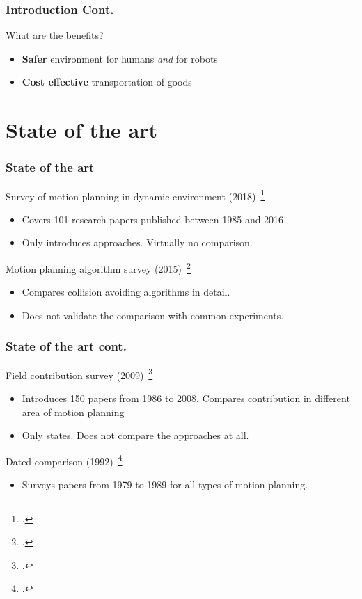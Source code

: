 \documentclass{beamer}
\begin{document}
\begin{frame}
    \frametitle{\huge{Introduction Cont.}}
    \begin{block}{What are the benefits?}
        \begin{itemize}
            \item \textbf{Safer} environment for humans \textit{and} for robots
            \item \textbf{Cost effective} transportation of goods
        \end{itemize} 
    \end{block}
\end{frame}

\section{State of the art}
\begin{frame}
    \frametitle{\huge{State of the art}}
    \begin{block}{Survey of motion planning in dynamic environment (2018)~\footcite{mohanan2018a}}
        \begin{itemize}
            \color{blue} \item Covers 101 research papers published between 1985 and 2016
            \color{red}  \item Only introduces approaches. Virtually no comparison.
        \end{itemize}
    \end{block}
    \begin{block}{Motion planning algorithm survey (2015)~\footcite{hoy2015algorithms}}
        \begin{itemize}
            \color{blue} \item Compares collision avoiding algorithms in detail.
            \color{red}   \item Does not validate the comparison with common experiments.
        \end{itemize}
    \end{block}
\end{frame}

\begin{frame}
    \frametitle{\huge{State of the art cont.}}
    \begin{block}{Field contribution survey (2009)~\footcite{keshmiri2009overview}}
        \begin{itemize}
            \color{blue} \item Introduces 150 papers from 1986 to 2008. Compares contribution in different area of motion planning
            \color{red}   \item Only states. Does not compare the approaches at all.
        \end{itemize}
    \end{block}
    \begin{block}{Dated comparison (1992)~\footcite{hwang1992gross}}
        \begin{itemize}
            \color{blue} \item Surveys papers from 1979 to 1989 for all types of 
            motion planning.
        \end{itemize}
    \end{block}
\end{frame}
\end{document}
